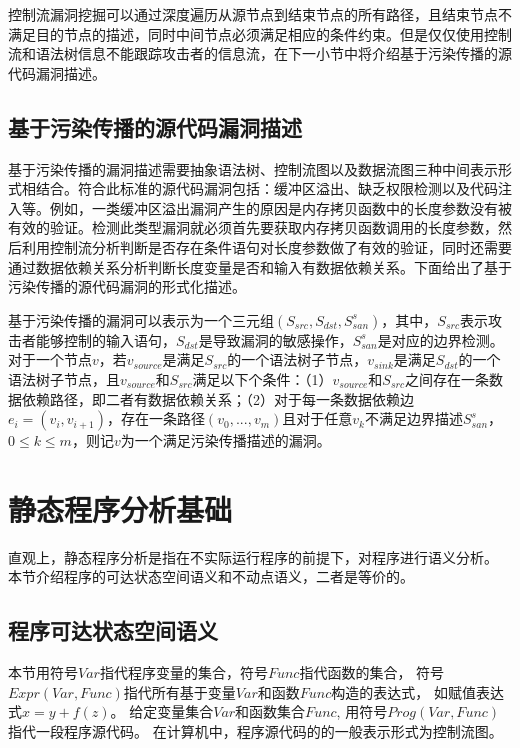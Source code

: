 控制流漏洞挖掘可以通过深度遍历从源节点到结束节点的所有路径，且结束节点不满足目的节点的描述，同时中间节点必须满足相应的条件约束。但是仅仅使用控制流和语法树信息不能跟踪攻击者的信息流，在下一小节中将介绍基于污染传播的源代码漏洞描述。

\subsection{基于污染传播的源代码漏洞描述}

基于污染传播的漏洞描述需要抽象语法树、控制流图以及数据流图三种中间表示形式相结合。符合此标准的源代码漏洞包括：缓冲区溢出、缺乏权限检测以及代码注入等。例如，一类缓冲区溢出漏洞产生的原因是内存拷贝函数中的长度参数没有被有效的验证。检测此类型漏洞就必须首先要获取内存拷贝函数调用的长度参数，然后利用控制流分析判断是否存在条件语句对长度参数做了有效的验证，同时还需要通过数据依赖关系分析判断长度变量是否和输入有数据依赖关系。下面给出了基于污染传播的源代码漏洞的形式化描述。

\begin{definition}
\label{基于污染传播的源代码漏洞描述}
基于污染传播的漏洞可以表示为一个三元组$(S_{src},S_{dst},S^{s}_{san})$，其中，$S_{src}$表示攻击者能够控制的输入语句，$S_{dst}$是导致漏洞的敏感操作，$S^{s}_{san}$是对应的边界检测。对于一个节点$v$，若$v_{source}$是满足$S_{src}$的一个语法树子节点，$v_{sink}$是满足$S_{dst}$的一个语法树子节点，且$v_{source}$和$S_{src}$满足以下个条件：（1）$v_{source}$和$S_{src}$之间存在一条数据依赖路径，即二者有数据依赖关系；（2）对于每一条数据依赖边$e_i = (v_i, v_{i+1})$，存在一条路径$(v_0,...,v_m)$且对于任意$v_k$不满足边界描述$S^{s}_{san}$，$0 \leq k \leq m$，则记$v$为一个满足污染传播描述的漏洞。
\end{definition}

\section{静态程序分析基础}

直观上，静态程序分析是指在不实际运行程序的前提下，对程序进行语义分析。
本节介绍程序的可达状态空间语义和不动点语义，二者是等价的。

\subsection{程序可达状态空间语义}

本节用符号$Var$指代程序变量的集合，符号$Func$指代函数的集合，
符号$Expr(Var, Func)$指代所有基于变量$Var$和函数$Func$构造的表达式，
如赋值表达式$x = y + f(z)$。
给定变量集合$Var$和函数集合$Func$, 用符号$Prog(Var, Func)$指代一段程序源代码。
在计算机中，程序源代码的的一般表示形式为控制流图。

